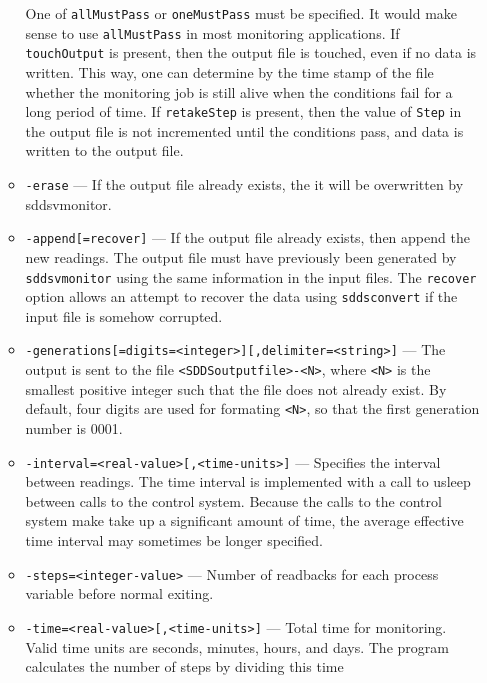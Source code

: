 \begin{itemize}
\begin{itemize}
                One of \verb+allMustPass+ or \verb+oneMustPass+ must be specified. It would make sense
                to use \verb+allMustPass+ in most monitoring applications.
                If \verb+touchOutput+ is present, then the output file is touched, even if no data
                is written. This way, one can determine by the time stamp of the file
                whether the monitoring job is still alive
                when the conditions fail for a long period of time. If \verb+retakeStep+ is
                present, then the value of \verb+Step+ in the output file is not
                incremented until the conditions pass, and data is written to the output file.

        \item {\tt -erase} --- If the output file already exists, the it will be overwritten
                by sddsvmonitor.
        \item {\tt -append[=recover]} --- If the output file already exists, then append the new readings.
                The output file must have previously been generated by \verb+sddsvmonitor+ using the same
                information in the input files.
                The {\verb+recover+} option allows an attempt
                to recover the data using \verb+sddsconvert+ if the input file is somehow corrupted.
        \item {\verb+-generations[=digits=<integer>][,delimiter=<string>]+} ---
                The output is sent to the file \verb+<SDDSoutputfile>-<N>+, where \verb+<N>+ is
                   the smallest positive integer such that the file does not already
                   exist.   By default, four digits are used for formating \verb+<N>+, so that
                   the first generation number is 0001.
        \item {\tt -interval=<real-value>[,<time-units>]} --- Specifies the interval between readings. The time
                interval is implemented with a call to usleep between calls to the control system.
                Because the calls to the control system make take up a significant amount of time, the average
                effective time interval may sometimes be longer specified. 
        \item {\tt -steps=<integer-value>} --- Number of readbacks for each process variable before normal exiting.
        \item {\tt -time=<real-value>[,<time-units>]} --- Total time for monitoring. Valid time units are
                seconds, minutes, hours, and days. The program calculates the number of steps by dividing this time

\end{itemize}
\end{itemize}
